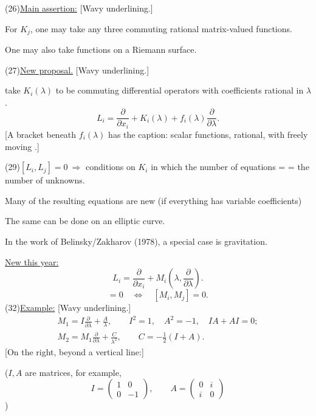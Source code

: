 (26)\quad \underline{Main assertion:} [Wavy underlining.]

For $K_j$, one may take any three commuting rational matrix-valued functions.

One may also take functions on a Riemann surface.

(27)\quad \underline{New proposal.} [Wavy underlining.]

take $K_i(\lambda)$ to be commuting differential operators with coefficients rational in $\lambda$.
\begin{equation*}
L_i=\frac{\partial}{\partial x_i}+K_i(\lambda)+f_i(\lambda)\frac{\partial}{\partial\lambda}. \tag{28}
\end{equation*}
[A bracket beneath $f_i(\lambda)$ has the caption: scalar functions, rational, with freely moving .]

(29)\quad $[L_i,L_j]=0\ \Rightarrow$ conditions on $K_i$ in which the number of equations =
\newline
= the number of unknowns.

Many of the resulting equations are new (if everything has variable coefficients)

The same can be done on an elliptic curve.

In the work of Belinsky/Zakharov (1978), a special case is gravitation.

\underline{New this year:}
\begin{equation*}
L_i=\frac{\partial}{\partial x_i}+M_i\left(\lambda,\frac{\partial}{\partial\lambda}\right). \tag{30}
\end{equation*}
\begin{equation*}
[L_i,L_j]=0\quad\Longleftrightarrow\quad[M_i,M_j]=0. \tag{31}
\end{equation*}
(32)\quad \underline{Example:} [Wavy underlining.]
\begin{equation*}
\begin{gathered}
M_1=I\frac{\partial}{\partial\lambda}+\frac A\lambda,
\qquad I^2=1,\quad A^2=-1,\quad IA+AI=0;\\[4pt]
M_2=M_1\frac{\partial}{\partial\lambda}+\frac C{\lambda^2},
\qquad C=-\frac12(I+A).
\end{gathered}
\end{equation*}
[On the right, beyond a vertical line:]

($I,A$ are matrices, for example,
\begin{equation*}
I=\begin{pmatrix}1&0\\0&-1\end{pmatrix},\qquad
A=\begin{pmatrix}0&i\\i&0\end{pmatrix}
\end{equation*}
)

